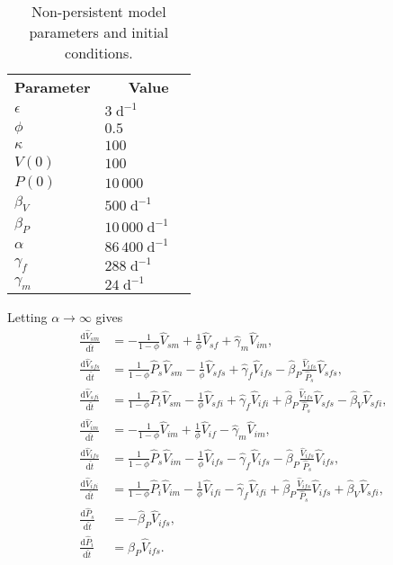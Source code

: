 \documentclass{article}
\newcommand{\md}{\mathrm{d}}
\begin{document}
\begin{table}
  \centering
  \begin{tabular}{llr}
    \textbf{Parameter}
    & \multicolumn{1}{r}{\textbf{Value}}
    \\
    $\epsilon$ & $3\;\text{d}^{-1}$
    \\
    $\phi$ & $0.5$
    \\
    $\kappa$ & $100$
    \\
    $V(0)$ & $100$
    \\
    $P(0)$ & $10\,000$
    \\
    $\beta_V$ & $500\;\text{d}^{-1}$
    \\
    $\beta_P$ & $10\,000\;\text{d}^{-1}$
    \\
    $\alpha$ & $86\,400\;\text{d}^{-1}$
    \\
    $\gamma_f$ & $288\;\text{d}^{-1}$ \\
    $\gamma_m$ & $24\;\text{d}^{-1}$
  \end{tabular}
  \caption{Non-persistent model parameters and initial conditions.}
\end{table}

Letting $\alpha \to \infty$ gives
\begin{equation}
  \begin{split}
    \frac{\md \hat{V}_{sm}}{\md \hat{t}}
    &=
    - \frac{1}{1 - \phi} \hat{V}_{sm}
    + \frac{1}{\phi} \hat{V}_{sf}
    + \hat{\gamma}_m \hat{V}_{im},
    \\
    \frac{\md \hat{V}_{sfs}}{\md \hat{t}}
    &=
    \frac{1}{1 - \phi} \hat{P}_s \hat{V}_{sm}
    - \frac{1}{\phi} \hat{V}_{sfs}
    + \hat{\gamma}_f \hat{V}_{ifs}
    - \hat{\beta}_P \frac{\hat{V}_{ifs}}{\hat{P}_s} \hat{V}_{sfs},
    \\
    \frac{\md \hat{V}_{sfi}}{\md \hat{t}}
    &=
    \frac{1}{1 - \phi} \hat{P}_i \hat{V}_{sm}
    - \frac{1}{\phi} \hat{V}_{sfi}
    + \hat{\gamma}_f \hat{V}_{ifi}
    + \hat{\beta}_P \frac{\hat{V}_{ifs}}{\hat{P}_s} \hat{V}_{sfs}
    - \hat{\beta}_V \hat{V}_{sfi},
    \\
    \frac{\md \hat{V}_{im}}{\md \hat{t}}
    &=
    - \frac{1}{1 - \phi} \hat{V}_{im}
    + \frac{1}{\phi} \hat{V}_{if}
    - \hat{\gamma}_m \hat{V}_{im},
    \\
    \frac{\md \hat{V}_{ifs}}{\md \hat{t}}
    &=
    \frac{1}{1 - \phi} \hat{P}_s \hat{V}_{im}
    - \frac{1}{\phi} \hat{V}_{ifs}
    - \hat{\gamma}_f \hat{V}_{ifs}
    - \hat{\beta}_P \frac{\hat{V}_{ifs}}{\hat{P}_s} \hat{V}_{ifs},
    \\
    \frac{\md \hat{V}_{ifi}}{\md \hat{t}}
    &=
    \frac{1}{1 - \phi} \hat{P}_i \hat{V}_{im}
    - \frac{1}{\phi} \hat{V}_{ifi}
    - \hat{\gamma}_f \hat{V}_{ifi}
    + \hat{\beta}_P \frac{\hat{V}_{ifs}}{\hat{P}_s} \hat{V}_{ifs}
    + \hat{\beta}_V \hat{V}_{sfi},
    \\
    \frac{\md \hat{P}_s}{\md \hat{t}}
    &=
    - \hat{\beta}_P \hat{V}_{ifs},
    \\
    \frac{\md \hat{P}_i}{\md \hat{t}}
    &=
    \hat{\beta}_P \hat{V}_{ifs}.
  \end{split}
\end{equation}
\end{document}
